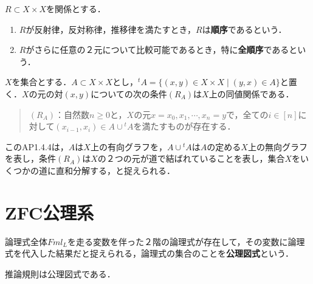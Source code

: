\documentclass[uplatex,dvipdfmx]{jsreport}
\begin{document}
\begin{definition}[order]
    $R\subset X\times X$を関係とする．
    \begin{enumerate}
        \item $R$が反射律，反対称律，推移律を満たすとき，$R$は\textbf{順序}であるという．
        \item $R$がさらに任意の２元について比較可能であるとき，特に\textbf{全順序}であるという．
    \end{enumerate}
\end{definition}

\begin{problem}[AP1.4.4：部分集合Aによって生成される同値関係]
    $X$を集合とする．$A\subset X\times X$とし，${}^t\!A=\{ (x,y)\in X\times X\mid(y,x)\in A\}$と置く．$X$の元の対$(x,y)$についての次の条件$(R_A)$は$X$上の同値関係である．
    \begin{quote}
        $(R_A)$：自然数$n\ge 0$と，$X$の元$x=x_0,x_1,\cdots,x_n=y$で，全ての$i\in [n]$に対して$(x_{i-1},x_i)\in A\cup {}^t\!A$を満たすものが存在する．
    \end{quote}
\end{problem}
\begin{remark}
    このAP1.4.4は，$A$は$X$上の有向グラフを，$A\cup {}^t\!A$は$A$の定める$X$上の無向グラフを表し，条件$(R_A)$は$X$の２つの元が道で結ばれていることを表し，集合$X$をいくつかの道に直和分解する，と捉えられる．
\end{remark}

\section{ZFC公理系}

\begin{definition}
    論理式全体$Fml_L$を走る変数を伴った２階の論理式が存在して，その変数に論理式を代入した結果だと捉えられる，論理式の集合のことを\textbf{公理図式}という．
\end{definition}
\begin{example}
    推論規則は公理図式である．
\end{example}
\end{document}
